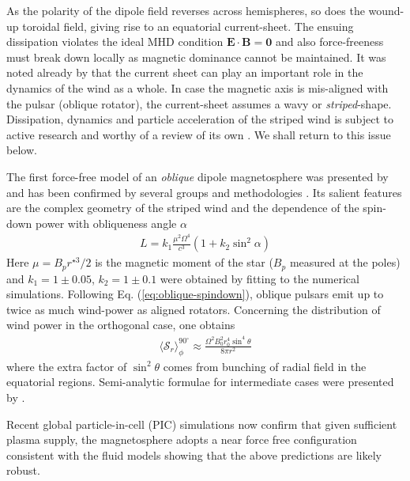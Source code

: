 As the polarity of the dipole field reverses across hemispheres, so does the wound-up toroidal field, giving rise to an equatorial current-sheet.  The ensuing dissipation violates the ideal MHD condition $\mathbf{E\cdot B=0}$ and also force-freeness must break down locally as magnetic dominance cannot be maintained.  
It was noted already by \cite{coroniti1990} that the current sheet can play an important role in the dynamics of the wind as a whole.  In case the magnetic axis is mis-aligned with the pulsar (oblique rotator), the current-sheet assumes a wavy or \emph{striped}-shape.  Dissipation, dynamics and particle acceleration of the striped wind is subject to active research and worthy of a review of its own \citep[see ][]{arons2012}.  We shall return to this issue below.  

The first force-free model of an \emph{oblique} dipole magnetosphere was presented by \cite{spitkovsky2006} and has been confirmed by several groups and methodologies \citep{kalapotharakos2012,2016MNRAS.455.3779P,2016MNRAS.457.3384T}.  Its salient features are the complex geometry of the  striped wind \citep[as predicted by][]{Michel1971} and the dependence of the spin-down power with obliqueness angle $\alpha$
\begin{align}
L = k_1 \frac{\mu^2 \Omega^4}{c^3}(1+k_2\sin^2 \alpha) \label{eq:oblique-spindown}
\end{align}
Here $\mu=B_p r^{\star3}/2$ is the magnetic moment of the star ($B_p$ measured at the poles) and $k_1=1 \pm 0.05$, $k_2 =1\pm 0.1$ were obtained by fitting to the numerical simulations.  Following Eq. (\ref{eq:oblique-spindown}), oblique pulsars emit up to twice as much wind-power as aligned rotators.  Concerning the distribution of wind power in the orthogonal case, one obtains 
\begin{align}
\langle \mathcal{S}_r\rangle_\phi^{90^\circ} \approx \frac{\Omega^2 B_0^2 r_0^4 \sin^4\theta}{8\pi r^2} \label{eq:obliquesr}
\end{align}
where the extra factor of $\sin^2\theta$ comes from bunching of radial field in the equatorial regions.  Semi-analytic formulae for intermediate cases were presented by \cite{2016MNRAS.457.3384T}.  

Recent global particle-in-cell (PIC) simulations now confirm that given sufficient plasma supply, the magnetosphere adopts a near force free configuration consistent with the fluid models \citep{PhilippovSpitkovsky2014,ChenBeloborodov2014,Belyaev2015,CeruttiPhilippov2015} showing that the above predictions are likely robust.  


